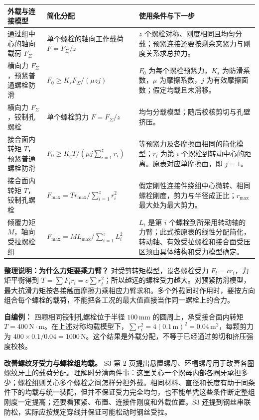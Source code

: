 \documentclass[zihao=5,a4paper,UTF8,fontset=fandol]{ctexart}
\begin{document}
\begin{longtable}{p{4.86cm}p{4.86cm}p{4.86cm}}
\toprule
外载与连接模型 & 简化分配 & 使用条件与下一步 \\

\midrule
\endhead
通过组中心的轴向载荷 $F_\Sigma$ & 单个螺栓的轴向工作载荷 $F=F_\Sigma/z$ & $z$ 个螺栓对称、刚度相同且均匀分载；预紧连接还要按剩余夹紧力与刚度关系求总拉力。 \\
横向力 $F_\Sigma$，预紧普通螺栓防滑 & $F_0\ge K_sF_\Sigma/(\mu z j)$ & $F_0$ 为每个螺栓预紧力，$K_s$ 为防滑系数，$\mu$ 为摩擦系数，$j$ 为有效摩擦面数；假定均载且未滑移。 \\
横向力 $F_\Sigma$，铰制孔螺栓 & 单个螺栓剪力 $F=F_\Sigma/z$ & 均匀分载模型；随后校核剪切与孔壁挤压。 \\
接合面内转矩 $T$，预紧普通螺栓防滑 & $F_0\ge K_sT/(\mu j\sum_{i=1}^{z}r_i)$ & 等预紧力及各摩擦面相同的简化模型；$r_i$ 为第 $i$ 个螺栓到转动中心的距离。原表对应单摩擦面，即 $j=1$。 \\
接合面内转矩 $T$，铰制孔螺栓 & $F_{\max}=Tr_{\max}/\sum_{i=1}^{z}r_i^2$ & 假定刚性连接件绕组中心微转、相同螺栓刚度，剪力与半径成正比；$r_{\max}$ 最大处为最大剪力。 \\
倾覆力矩 $M$，轴向受拉螺栓组 & $F_{\max}=ML_{\max}/\sum_{i=1}^{z}L_i^2$ & $L_i$ 是第 $i$ 个螺栓到所采用转动轴的力臂；此式按原表的线性分配简化，转动轴、有效受拉螺栓和接合面受压区须由具体结构和受力模型确定。 \\
\bottomrule
\end{longtable}

\textbf{整理说明：为什么力矩要乘力臂？} 对受剪转矩模型，设各螺栓受力 $F_i=cr_i$，力矩平衡得到 $T=\sum F_ir_i=c\sum r_i^2$；所以越远的螺栓受力越大。对预紧防滑模型，最大抗滑力矩按各接触面摩擦力乘相应力臂求和。多个外载同时作用时，要按方向组合每个螺栓的载荷，不能把各工况的最大值直接当作同一螺栓上的合力。


\textbf{自编例：} 四颗相同铰制孔螺栓位于半径 $100\,\mathrm{mm}$ 的圆周上，承受接合面内转矩 $T=400\,\mathrm{N\cdot m}$。在上述对称均载模型下，$\sum r_i^2=4(0.1\,\mathrm m)^2=0.04\,\mathrm{m^2}$，每颗剪力为 $400\times0.1/0.04=1000\,\mathrm N$。这个结果是外载分配，不等于已经通过剪切和挤压强度校核。


\textbf{改善螺纹牙受力与螺栓组均载。} S3 第 2 页提出悬置螺母、环槽螺母用于改善各圈螺纹牙上的载荷分配。理解时分清两件事：这里关心一个螺母内部各圈牙承担多少；螺栓组则关心多个螺栓之间怎样分担外载。相同材料、直径和长度有助于同条件下的均载与统一装配，但并不保证受力完全均匀，也不能单凭这些条件断定整组刚度一定提高；还要看预紧、布置、连接件刚度和外载位置。S3 还提到钢丝串联防松，实际应按规定穿线并保证可能松动时钢丝受拉。
\end{document}
